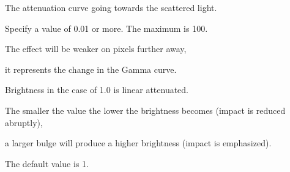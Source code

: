 \documentclass[a4paper,12pt]{article}
\begin{document}
The attenuation curve going towards the scattered light.\par
Specify a value of 0.01 or more. The maximum is 100.\par
The effect will be weaker on pixels further away,\par
it represents the change in the Gamma curve.\par
Brightness in the case of 1.0 is linear attenuated.\par
The smaller the value the lower the brightness becomes (impact is reduced abruptly),\par
a larger bulge will produce a higher brightness (impact is emphasized).\par
The default value is 1.

\newpage

\thispagestyle{empty}
\end{document}
